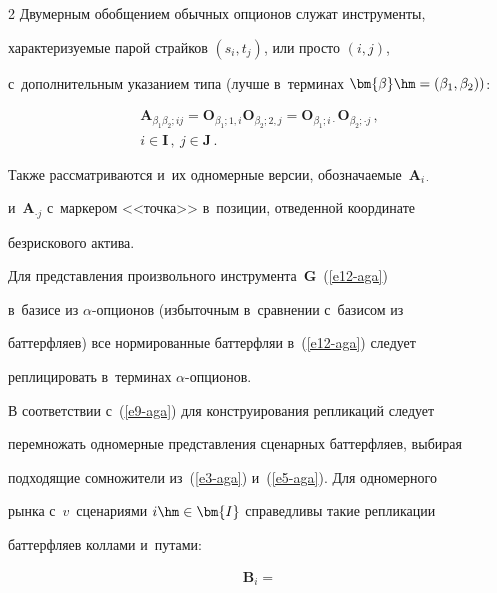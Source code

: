 \begin{multicols}{2}
  Двумерным обобщением обычных опционов служат инструменты, 


характеризуемые парой страйков $(s_i,t_j)$, или просто $(i,j)$, 


с~дополнительным указанием типа (лучше в~терминах $\bm{\beta}\hm=(\beta_1, 


\beta_2))$: 


\begin{multline*}


\bm{A}_{\beta_1\beta_2;ij} 


=\bm{O}_{\beta_1;1,i}\bm{O}_{\beta_2;2,j}=\bm{O}_{\beta_1;i\cdot} 


\bm{O}_{\beta_2;\cdot j}\,,\\ 


i\in \bm{I}\,,\ j\in \bm{J}\,.


\end{multline*}




  Также рассматриваются и~их одномерные версии, обозначаемые~$\bm{A}_{i\cdot}$ 


и~$\bm{A}_{\cdot j}$ с~маркером <<точка>> в~позиции, отведенной координате 


безрискового актива. 


  


  Для представления произвольного инструмента~$\bm{G}$~(\ref{e12-aga}) 


в~базисе из $\alpha$-оп\-ци\-онов (избыточным в~сравнении с~базисом из 


баттерфляев) все нормированные баттерфляи в~(\ref{e12-aga}) следует 


реплицировать в~терминах $\alpha$-оп\-ци\-онов. 


  


  В соответствии с~(\ref{e9-aga}) для конструирования репликаций следует 


перемножать одномерные представления сценарных баттерфляев, выбирая 


подходящие сомножители из~(\ref{e3-aga}) и~(\ref{e5-aga}). Для одномерного 


рынка с~$v$~сценариями $i\hm\in \bm{I}$ справедливы такие репликации 


баттерфляев коллами и~путами:


  \begin{multline}


  \bm{B}_i={}\\



\end{multline}
\end{multicols}
